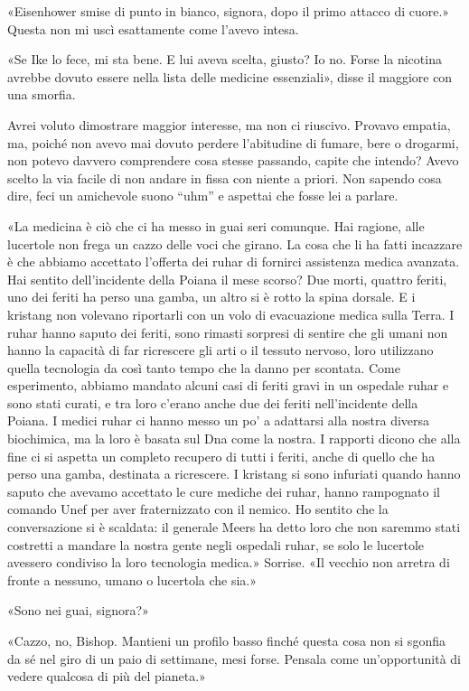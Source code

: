 «Eisenhower smise di punto in bianco, signora, dopo il primo attacco di
cuore.» Questa non mi uscì esattamente come l'avevo intesa.

«Se Ike lo fece, mi sta bene. E lui aveva scelta, giusto? Io no. Forse
la nicotina avrebbe dovuto essere nella lista delle medicine
essenziali», disse il maggiore con una smorfia.

Avrei voluto dimostrare maggior interesse, ma non ci riuscivo. Provavo
empatia, ma, poiché non avevo mai dovuto perdere l'abitudine di fumare,
bere o drogarmi, non potevo davvero comprendere cosa stesse passando,
capite che intendo? Avevo scelto la via facile di non andare in fissa
con niente a priori. Non sapendo cosa dire, feci un amichevole suono
``uhm'' e aspettai che fosse lei a parlare.

«La medicina è ciò che ci ha messo in guai seri comunque. Hai ragione,
alle lucertole non frega un cazzo delle voci che girano. La cosa che li
ha fatti incazzare è che abbiamo accettato l'offerta dei ruhar di
fornirci assistenza medica avanzata. Hai sentito dell'incidente della
Poiana il mese scorso? Due morti, quattro feriti, uno dei feriti ha
perso una gamba, un altro si è rotto la spina dorsale. E i kristang non
volevano riportarli con un volo di evacuazione medica sulla Terra. I
ruhar hanno saputo dei feriti, sono rimasti sorpresi di sentire che gli
umani non hanno la capacità di far ricrescere gli arti o il tessuto
nervoso, loro utilizzano quella tecnologia da così tanto tempo che la
danno per scontata. Come esperimento, abbiamo mandato alcuni casi di
feriti gravi in un ospedale ruhar e sono stati curati, e tra loro
c'erano anche due dei feriti nell'incidente della Poiana. I medici ruhar
ci hanno messo un po' a adattarsi alla nostra diversa biochimica, ma la
loro è basata sul Dna come la nostra. I rapporti dicono che alla fine ci
si aspetta un completo recupero di tutti i feriti, anche di quello che
ha perso una gamba, destinata a ricrescere. I kristang si sono infuriati
quando hanno saputo che avevamo accettato le cure mediche dei ruhar,
hanno rampognato il comando Unef per aver fraternizzato con il nemico.
Ho sentito che la conversazione si è scaldata: il generale Meers ha
detto loro che non saremmo stati costretti a mandare la nostra gente
negli ospedali ruhar, se solo le lucertole avessero condiviso la loro
tecnologia medica.» Sorrise. «Il vecchio non arretra di fronte a
nessuno, umano o lucertola che sia.»

«Sono nei guai, signora?»

«Cazzo, no, Bishop. Mantieni un profilo basso finché questa cosa non si
sgonfia da sé nel giro di un paio di settimane, mesi forse. Pensala come
un'opportunità di vedere qualcosa di più del pianeta.»

